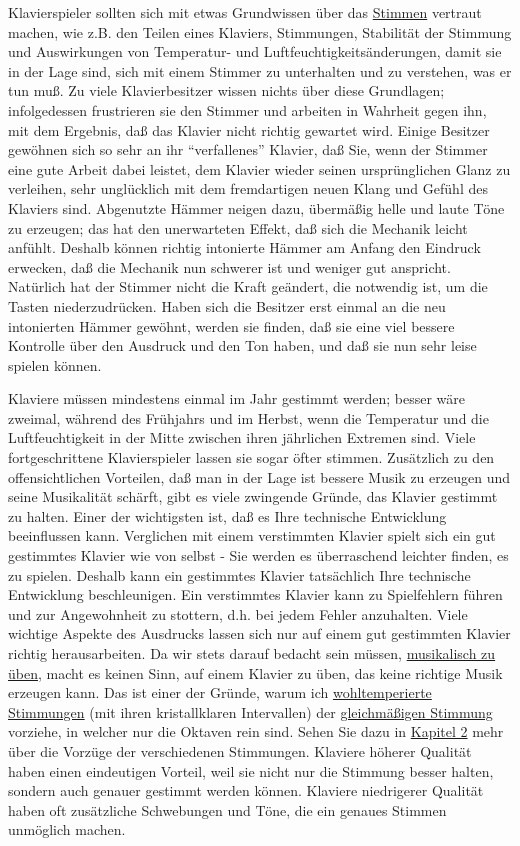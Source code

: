 Klavierspieler sollten sich mit etwas Grundwissen über das \hyperlink{c2_1}{Stimmen} vertraut machen, wie z.B. den Teilen eines Klaviers, Stimmungen, Stabilität der Stimmung und Auswirkungen von Temperatur- und Luftfeuchtigkeitsänderungen, damit sie in der Lage sind, sich mit einem Stimmer zu unterhalten und zu verstehen, was er tun muß.
Zu viele Klavierbesitzer wissen nichts über diese Grundlagen; infolgedessen frustrieren sie den Stimmer und arbeiten in Wahrheit gegen ihn, mit dem Ergebnis, daß das Klavier nicht richtig gewartet wird.
Einige Besitzer gewöhnen sich so sehr an ihr \enquote{verfallenes} Klavier, daß Sie, wenn der Stimmer eine gute Arbeit dabei leistet, dem Klavier wieder seinen ursprünglichen Glanz zu verleihen, sehr unglücklich mit dem fremdartigen neuen Klang und Gefühl des Klaviers sind.
Abgenutzte Hämmer neigen dazu, übermäßig helle und laute Töne zu erzeugen; das hat den unerwarteten Effekt, daß sich die Mechanik leicht anfühlt.
Deshalb können richtig intonierte Hämmer am Anfang den Eindruck erwecken, daß die Mechanik nun schwerer ist und weniger gut anspricht.
Natürlich hat der Stimmer nicht die Kraft geändert, die notwendig ist, um die Tasten niederzudrücken.
Haben sich die Besitzer erst einmal an die neu intonierten Hämmer gewöhnt, werden sie finden, daß sie eine viel bessere Kontrolle über den Ausdruck und den Ton haben, und daß sie nun sehr leise spielen können.

Klaviere müssen mindestens einmal im Jahr gestimmt werden; besser wäre zweimal, während des Frühjahrs und im Herbst, wenn die Temperatur und die Luftfeuchtigkeit in der Mitte zwischen ihren jährlichen Extremen sind.
Viele fortgeschrittene Klavierspieler lassen sie sogar öfter stimmen.
Zusätzlich zu den offensichtlichen Vorteilen, daß man in der Lage ist bessere Musik zu erzeugen und seine Musikalität schärft, gibt es viele zwingende Gründe, das Klavier gestimmt zu halten.
Einer der wichtigsten ist, daß es Ihre technische Entwicklung beeinflussen kann.
Verglichen mit einem verstimmten Klavier spielt sich ein gut gestimmtes Klavier wie von selbst - Sie werden es überraschend leichter finden, es zu spielen.
Deshalb kann ein gestimmtes Klavier tatsächlich Ihre technische Entwicklung beschleunigen.
Ein verstimmtes Klavier kann zu Spielfehlern führen und zur Angewohnheit zu stottern, d.h. bei jedem Fehler anzuhalten.
Viele wichtige Aspekte des Ausdrucks lassen sich nur auf einem gut gestimmten Klavier richtig herausarbeiten.
Da wir stets darauf bedacht sein müssen, \hyperlink{c1iii14d}{musikalisch zu üben}, macht es keinen Sinn, auf einem Klavier zu üben, das keine richtige Musik erzeugen kann.
Das ist einer der Gründe, warum ich \hyperlink{c2_2_wtk2}{wohltemperierte Stimmungen} (mit ihren kristallklaren Intervallen) der \hyperlink{c2_6_et}{gleichmäßigen Stimmung} vorziehe, in welcher nur die Oktaven rein sind.
Sehen Sie dazu in \hyperlink{c2_1}{Kapitel 2} mehr über die Vorzüge der verschiedenen Stimmungen.
Klaviere höherer Qualität haben einen eindeutigen Vorteil, weil sie nicht nur die Stimmung besser halten, sondern auch genauer gestimmt werden können.
Klaviere niedrigerer Qualität haben oft zusätzliche Schwebungen und Töne, die ein genaues Stimmen unmöglich machen.

